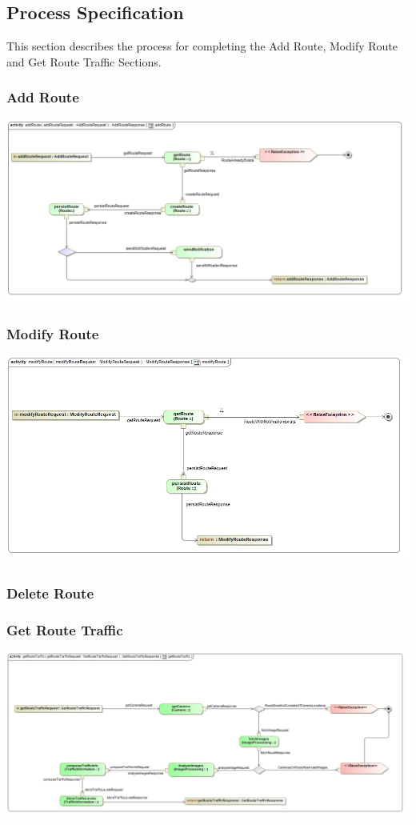 \documentclass[a4paper,12pt]{article}
\begin{document}
\subsection{Process Specification}
This section describes the process for completing the Add Route, Modify Route and Get Route Traffic Sections.
\subsubsection{Add Route}
\includegraphics[width=\textwidth]{images/psAdd_Route.jpg}
\subsubsection{Modify Route}
\includegraphics[width=\textwidth]{images/psModify_Route.jpg} 
\subsubsection{Delete Route}
\subsubsection{Get Route Traffic}
\includegraphics[width=\textwidth]{images/ps_GetRouteTraffic.jpg}
\end{document}
